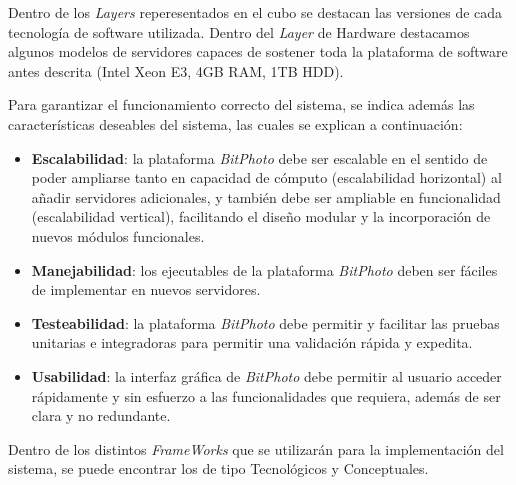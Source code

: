 \documentclass{memoria}
\begin{document}
Dentro de los \textsl{Layers} reperesentados en el cubo se destacan las versiones de cada tecnología de software utilizada. Dentro del \textsl{Layer} de Hardware destacamos algunos modelos de servidores capaces de sostener toda la plataforma de software antes descrita (Intel Xeon E3, 4GB RAM, 1TB HDD).

Para garantizar el funcionamiento correcto del sistema, se indica además las características deseables del sistema, las cuales se explican a continuación:

\begin{itemize}
\item \textbf{Escalabilidad}: la plataforma \textsl{BitPhoto} debe ser escalable en el sentido de poder ampliarse tanto en capacidad de cómputo (escalabilidad horizontal) al añadir servidores adicionales, y también debe ser ampliable en funcionalidad (escalabilidad vertical), facilitando el diseño modular y la incorporación de nuevos módulos funcionales.

\item \textbf{Manejabilidad}: los ejecutables de la plataforma \textsl{BitPhoto} deben ser fáciles de implementar en nuevos servidores.

\item \textbf{Testeabilidad}: la plataforma \textsl{BitPhoto} debe permitir y facilitar las pruebas unitarias e integradoras para permitir una validación rápida y expedita.

\item \textbf{Usabilidad}: la interfaz gráfica de \textsl{BitPhoto} debe permitir al usuario acceder rápidamente y sin esfuerzo a las funcionalidades que requiera, además de ser clara y no redundante.
\end{itemize}



Dentro de los distintos \textsl{FrameWorks} que se utilizarán para la implementación del sistema, se puede encontrar los de tipo Tecnológicos y Conceptuales.

\end{document}
